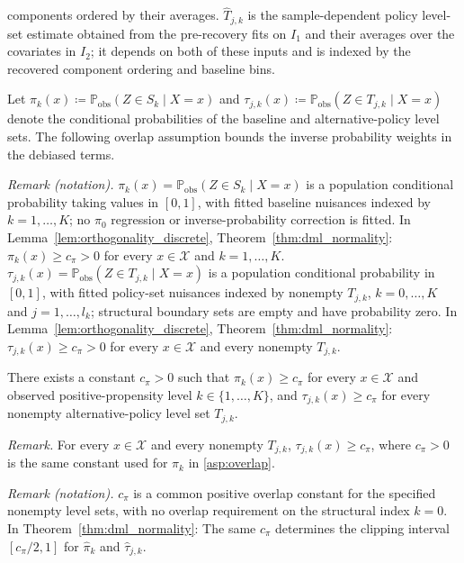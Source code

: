 components ordered by their averages. $\widehat T_{j,k}$ is the sample-dependent policy level-set estimate obtained from the pre-recovery fits on $I_1$ and their averages over the covariates in $I_2$; it depends on both of these inputs and is indexed by the recovered component ordering and baseline bins.


Let $\pi_k(x) \coloneqq \mathbb{P}_{\text{obs}}(Z \in S_k \mid X=x)$ and $\tau_{j,k}(x) \coloneqq \mathbb{P}_{\text{obs}}(Z \in T_{j,k} \mid X=x)$ denote the conditional probabilities of the baseline and alternative-policy level sets. The following overlap assumption bounds the inverse probability weights in the debiased terms.

\noindent\textit{Remark (notation).} $\pi_k(x)=\mathbb P_{\mathrm{obs}}(Z\in S_k\mid X=x)$ is a population conditional probability taking values in $[0,1]$, with fitted baseline nuisances indexed by $k=1,\ldots,K$; no $\pi_0$ regression or inverse-probability correction is fitted. In Lemma~\ref{lem:orthogonality_discrete}, Theorem~\ref{thm:dml_normality}: $\pi_k(x)\geqslant c_\pi>0$ for every $x\in\mathcal X$ and $k=1,\ldots,K$. $\tau_{j,k}(x)=\mathbb P_{\mathrm{obs}}(Z\in T_{j,k}\mid X=x)$ is a population conditional probability in $[0,1]$, with fitted policy-set nuisances indexed by nonempty $T_{j,k}$, $k=0,\ldots,K$ and $j=1,\ldots,l_k$; structural boundary sets are empty and have probability zero. In Lemma~\ref{lem:orthogonality_discrete}, Theorem~\ref{thm:dml_normality}: $\tau_{j,k}(x)\geqslant c_\pi>0$ for every $x\in\mathcal X$ and every nonempty $T_{j,k}$.


\begin{assumption}[Overlap]\label{asp:overlap}
    There exists a constant $c_\pi > 0$ such that $\pi_k(x) \geqslant c_\pi$ for every $x \in \mathcal{X}$ and observed positive-propensity level $k \in \{1, \dots, K\}$, and $\tau_{j,k}(x)\geqslant c_\pi$ for every nonempty alternative-policy level set $T_{j,k}$.
\end{assumption}

\noindent\textit{Remark.} For every $x\in\mathcal X$ and every nonempty $T_{j,k}$, $\tau_{j,k}(x)\geqslant c_\pi$, where $c_\pi>0$ is the same constant used for $\pi_k$ in \cref{asp:overlap}.

\noindent\textit{Remark (notation).} $c_\pi$ is a common positive overlap constant for the specified nonempty level sets, with no overlap requirement on the structural index $k=0$. In Theorem~\ref{thm:dml_normality}: The same $c_\pi$ determines the clipping interval $[c_\pi/2,1]$ for $\hat\pi_k$ and $\hat\tau_{j,k}$.

